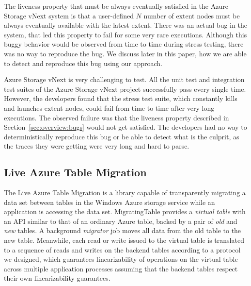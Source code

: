 The liveness property that must be always eventually satisfied in the Azure Storage vNext system is that a user-defined $N$ number of extent nodes must be always eventually available with the latest extent. There was an actual bug in the system, that led this property to fail for some very rare executions. Although this buggy behavior would be observed from time to time during stress testing, there was no way to reproduce the bug. We discuss later in this paper, how we are able to detect and reproduce this bug using our approach.

Azure Storage vNext is very challenging to test. All the unit test and integration test suites of the Azure Storage vNext project successfully pass every single time. However, the developers found that the stress test suite, which constantly kills and launches extent nodes, could fail from time to time after very long executions. The observed failure was that the liveness property described in Section~\ref{sec:overview:bugs} would not get satisfied. The developers had no way to deterministically reproduce this bug or be able to detect what is the culprit, as the traces they were getting were very long and hard to parse.

\subsection{Live Azure Table Migration}
\label{sec:cases:migration}

The Live Azure Table Migration is a library capable of transparently migrating a data set between tables in the Windows Azure storage service while an application is accessing the data set.  MigratingTable provides a \emph{virtual table} with an API similar to that of an ordinary Azure table, backed by a pair of \emph{old} and \emph{new}  tables.  A background \emph{migrator} job moves all data from the old table to the new table.  Meanwhile, each read or write issued to the virtual table is translated to a sequence of reads and writes on the backend tables according to a protocol we designed, which guarantees linearizability of operations on the virtual table across multiple application processes assuming that the backend tables respect their own linearizability guarantees.


